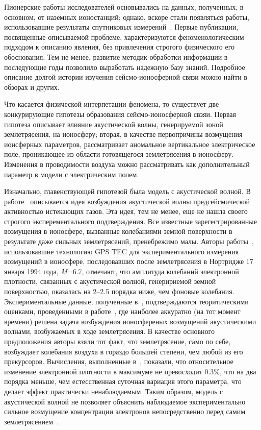 \documentclass[12pt, oneside, a4paper]{article}
\begin{document}
Пионерские работы исследователей основывались на данных, полученных, в основном, от наземных ионостанций; однако, вскоре стали появляться работы, использовавшие результаты спутниковых измерений~\cite{Gokhberg:1983}. Первые публикации, посвященные описываемой проблеме, характеризуются феноменологическим подходом к описанию явления, без привлечения строгого физического его обоснования. Тем не менее, развитие методик обработки информации в последующие годы позволило выработать надежную базу знаний. Подробное описание долгой истории изучения сейсмо-ионосферной связи  можно найти в обзорах \cite{Liperovsky:1990,Gaivoronskaya:1991} и других.

Что касается физической интерпетации феномена, то существует две конкурирующие гипотезы образования сейсмо-ионосферной свзяи. Первая гипотеза описывает влияние акустической волны, генерируемой зоной землетрясения, на ионосферу; вторая, в качестве первопричины возмущения ионсферных параметров, рассматривает аномальное вертикальное электрическое поле, проникающее из области готовящегося землетрясения в ионосферу.  Изменения в проводимости воздуха можно рассматривать как дополнительный параметр в модели с электрическим полем. 

Изначально, главенствующей гипотезой была модель с акустической волной. В  работе~\cite{Mareev:2002} описывается идея возбуждения акустической волны предсейсмической активностью истекающих газов. Эта идея, тем не менее, еще не нашла своего строгого эксперементального подтверждения. Все известные зарегестрированные возмущения в ионосфере, вызванные колебаниями земной поверхности в результате даже сильных землетрясений, пренебрежимо малы. Авторы работы~\cite{Calais_Minster:1995}, использовавшие технологию GPS TEC для экспериментального измерения возмущений в ионосфере, последовавших после землетрясения в Нортридже 17 января 1994 года, \emph{M}=6.7, отмечают, что амплитуда колебаний электронной плотности, связанных с акустической волной, генеририемой земной поверхностью, оказалась на 2--2.5 порядка ниже, чем фоновые колебания. Экспериментальные данные, полученные в~\cite{Calais_Minster:1995}, подтверждаются теоритическими оценками, проведенными в работе~\cite{Davies_Archambeau:1998}, где наиболее аккуратно (на тот момент времени) решена задача возбуждения ионосференых возмущений акустическими волнами, возбужаемых в ходе землетрясения. В качестве основного предположения авторы взяли тот факт, что землетрясение, само по себе, возбуждает колебания воздуха в гораздо большей степени, чем любой из его прекурсоров. Вычисления, выполненные в~\cite{Davies_Archambeau:1998}, показали, что относительное изменение электронной плотности в максимуме не превосходит $0.3\%$, что на два порядка меньше, чем естесственная суточная вариация этого параметра, что делает эффект практически ненаблюдаемым. Таким образом, модель с акустической волной не позволяет объяснить наблюдаемое экспериментально сильное возмущение концентрации электронов непосредственно перед самим землетрясением~\cite{Lui:2004}. 
\end{document}
